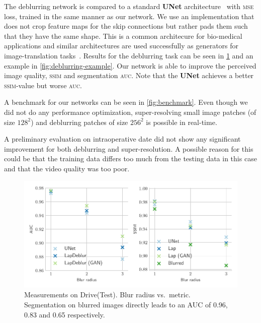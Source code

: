 \documentclass{scrartcl}
\begin{document}
The deblurring network is compared to a standard \textbf{UNet} architecture~\cite{Unet} with \textsc{mse} loss, trained in the same manner as our network.
We use an implementation that does not crop feature maps for the skip connections but rather pads them such that they have the same shape.
This is a common architecure for bio-medical applications and similar architectures are used successfully as generators for image-translation tasks~\cite{PatchGAN}.
Results for the deblurring task can be seen in \cref{fig:deblurring-metrics} and an example in \cref{fig:deblurring-example}.
Our network is able to improve the perceived image quality, \textsc{ssim} and segmentation \textsc{auc}.
Note that the \textbf{UNet} achieves a better \textsc{ssim}-value but worse \textsc{auc}.

A benchmark for our networks can be seen in \cref{fig:benchmark}.
Even though we did not do any performance optimization, super-resolving small image patches (of size $128^2$) and deblurring patches of size $256^2$ is possible in real-time.

A preliminary evaluation on intraoperative date did not show any significant improvement for both deblurring and super-resolution.
A possible reason for this could be that the training data differs too much from the testing data in this case and that the video quality was too poor.

\begin{figure}[htb]
\centering
\includegraphics[]{deblur_complete_paper}
\caption{Measurements on Drive(Test).
  Blur radius vs.\ metric.\\
Segmentation on blurred images directly leads to an AUC of 0.96, 0.83 and 0.65 respectively.}
\label{fig:deblurring-metrics}
\end{figure}
\end{document}
